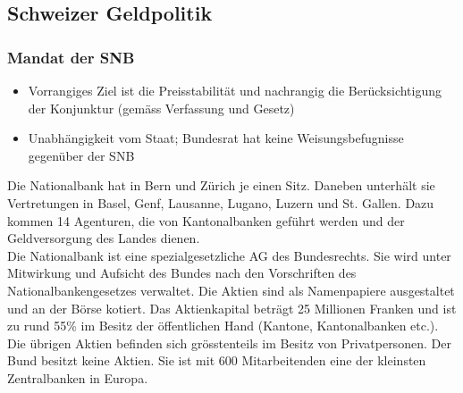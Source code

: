 \subsection{Schweizer Geldpolitik}

\subsubsection{Mandat der SNB}
\begin{itemize}
	\item Vorrangiges Ziel ist die Preisstabilität und nachrangig die Berücksichtigung der Konjunktur (gemäss Verfassung und Gesetz)
	\item Unabhängigkeit vom Staat; Bundesrat hat keine Weisungsbefugnisse gegenüber der SNB
\end{itemize}
Die Nationalbank hat in Bern und Zürich je einen Sitz. Daneben unterhält sie Vertretungen in Basel, Genf, Lausanne, Lugano, Luzern und St. Gallen. Dazu kommen 14 Agenturen, die von Kantonalbanken geführt werden und der Geldversorgung des Landes dienen.\\
Die Nationalbank ist eine spezialgesetzliche AG des Bundesrechts. Sie wird unter Mitwirkung und Aufsicht des Bundes nach den Vorschriften des Nationalbankengesetzes verwaltet. Die Aktien sind als Namenpapiere ausgestaltet und an der Börse kotiert. Das Aktienkapital beträgt 25 Millionen Franken und ist zu rund 55\% im Besitz der öffentlichen Hand (Kantone, Kantonalbanken etc.). Die übrigen Aktien befinden sich grösstenteils im Besitz von Privatpersonen. Der Bund besitzt keine Aktien. Sie ist mit 600 Mitarbeitenden eine der kleinsten Zentralbanken in Europa.

